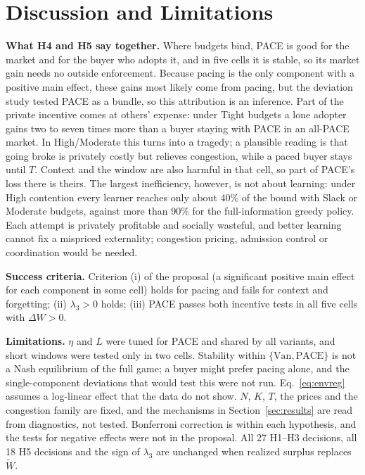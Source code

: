 \documentclass{article}
\begin{document}
\section{Discussion and Limitations}
\textbf{What H4 and H5 say together.} Where budgets bind, PACE is good for the market and for the buyer who adopts it, and in five cells it is stable, so its market gain needs no outside enforcement. Because pacing is the only component with a positive main effect, these gains most likely come from pacing, but the deviation study tested PACE as a bundle, so this attribution is an inference. Part of the private incentive comes at others' expense: under Tight budgets a lone adopter gains two to seven times more than a buyer staying with PACE in an all-PACE market. In High/Moderate this turns into a tragedy; a plausible reading is that going broke is privately costly but relieves congestion, while a paced buyer stays until $T$. Context and the window are also harmful in that cell, so part of PACE's loss there is theirs. The largest inefficiency, however, is not about learning: under High contention every learner reaches only about 40\% of the bound with Slack or Moderate budgets, against more than 90\% for the full-information greedy policy. Each attempt is privately profitable and socially wasteful, and better learning cannot fix a mispriced externality; congestion pricing, admission control or coordination would be needed.

\textbf{Success criteria.} Criterion (i) of the proposal (a significant positive main effect for each component in some cell) holds for pacing and fails for context and forgetting; (ii) $\lambda_3>0$ holds; (iii) PACE passes both incentive tests in all five cells with $\Delta W>0$.

\textbf{Limitations.} $\eta$ and $L$ were tuned for PACE and shared by all variants, and short windows were tested only in two cells. Stability within $\{\mathrm{Van},\mathrm{PACE}\}$ is not a Nash equilibrium of the full game; a buyer might prefer pacing alone, and the single-component deviations that would test this were not run. Eq.~\eqref{eq:envreg} assumes a log-linear effect that the data do not show. $N$, $K$, $T$, the prices and the congestion family are fixed, and the mechanisms in Section~\ref{sec:results} are read from diagnostics, not tested. Bonferroni correction is within each hypothesis, and the tests for negative effects were not in the proposal. All 27 H1--H3 decisions, all 18 H5 decisions and the sign of $\lambda_3$ are unchanged when realized surplus replaces $\widetilde W$.
\end{document}
